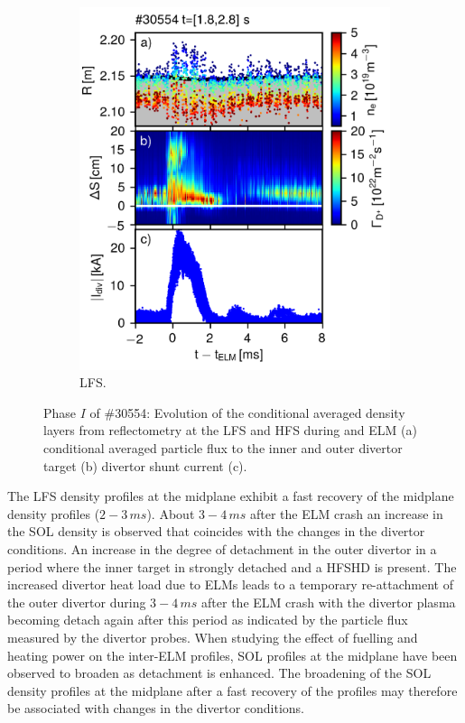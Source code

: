 \documentclass[12pt]{iopart}
\begin{document}
\begin{figure}[!hbt]
\begin{subfigure}{3in}
    \includegraphics{ssidiv_30554_1_8_2_8_outout.png}
	\caption{LFS.}
	\end{subfigure}
	\caption{Phase $I$ of \#30554: Evolution of the conditional averaged density layers from reflectometry at the LFS and HFS during and ELM (a) conditional averaged particle flux to the inner and outer divertor target (b) divertor shunt current (c).}
	\label{fig:elm_30554}
\end{figure}

The LFS density profiles at the midplane exhibit a fast recovery of the midplane density profiles ($2-3\,ms$). About $3-4\,ms$ after the ELM crash an increase in the SOL density is observed that coincides with the changes in the divertor conditions. An increase in the degree of detachment in the outer divertor in a period where the inner target in strongly detached and a HFSHD is present. The increased divertor heat load due to ELMs leads to a temporary re-attachment of the outer divertor during $3-4\,ms$ after the ELM crash with the divertor plasma becoming detach again after this period as indicated by the particle flux measured by the divertor probes. When studying the effect of fuelling and heating power on the inter-ELM profiles, SOL profiles at the midplane have been observed to broaden as detachment is enhanced. The broadening of the SOL density profiles at the midplane after a fast recovery of the profiles may therefore be associated with changes in the divertor conditions.
\end{document}
